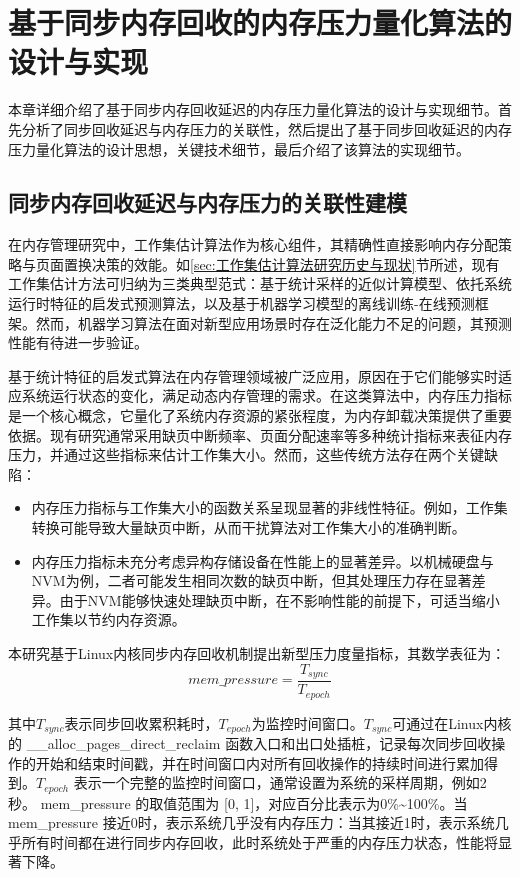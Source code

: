 \chapter{基于同步内存回收的内存压力量化算法的设计与实现}
\label{chap:基于同步内存回收的内存压力量化算法的设计与实现}
本章详细介绍了基于同步内存回收延迟的内存压力量化算法的设计与实现细节。首先分析了同步回收延迟与内存压力的关联性，然后提出了基于同步回收延迟的内存压力量化算法的设计思想，关键技术细节，最后介绍了该算法的实现细节。

\section{同步内存回收延迟与内存压力的关联性建模}

在内存管理研究中，工作集估计算法作为核心组件，其精确性直接影响内存分配策略与页面置换决策的效能。如\ref{sec:工作集估计算法研究历史与现状}节所述，现有工作集估计方法可归纳为三类典型范式：基于统计采样的近似计算模型、依托系统运行时特征的启发式预测算法，以及基于机器学习模型的离线训练-在线预测框架。然而，机器学习算法在面对新型应用场景时存在泛化能力不足的问题，其预测性能有待进一步验证。

基于统计特征的启发式算法在内存管理领域被广泛应用，原因在于它们能够实时适应系统运行状态的变化，满足动态内存管理的需求。在这类算法中，内存压力指标是一个核心概念，它量化了系统内存资源的紧张程度，为内存卸载决策提供了重要依据。现有研究通常采用缺页中断频率、页面分配速率等多种统计指标来表征内存压力，并通过这些指标来估计工作集大小。然而，这些传统方法存在两个关键缺陷：

\begin{itemize}
    \item 内存压力指标与工作集大小的函数关系呈现显著的非线性特征。例如，工作集转换可能导致大量缺页中断，从而干扰算法对工作集大小的准确判断。
    \item 内存压力指标未充分考虑异构存储设备在性能上的显著差异。以机械硬盘与NVM为例，二者可能发生相同次数的缺页中断，但其处理压力存在显著差异。由于NVM能够快速处理缺页中断，在不影响性能的前提下，可适当缩小工作集以节约内存资源。
\end{itemize}

本研究基于Linux内核同步内存回收机制提出新型压力度量指标，其数学表征为：
\begin{equation}
    \label{eq:mem_pressure}
    mem\_pressure = \frac{T_{sync}}{T_{epoch}}
\end{equation}

其中\(T_{sync}\)表示同步回收累积耗时，\(T_{epoch}\)为监控时间窗口。\(T_{sync}\)可通过在Linux内核的 \_\_alloc\_pages\_direct\_reclaim 函数入口和出口处插桩，记录每次同步回收操作的开始和结束时间戳，并在时间窗口内对所有回收操作的持续时间进行累加得到。\(T_{epoch}\) 表示一个完整的监控时间窗口，通常设置为系统的采样周期，例如2秒。 mem\_pressure  的取值范围为 [0, 1]，对应百分比表示为0\%\~{}100\%。当  mem\_pressure  接近0时，表示系统几乎没有内存压力：当其接近1时，表示系统几乎所有时间都在进行同步内存回收，此时系统处于严重的内存压力状态，性能将显著下降。

